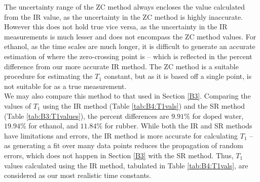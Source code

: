 The uncertainty range of the ZC method always encloses the value calculated from the IR value, as the uncertainty in the ZC method is highly inaccurate. However this does not hold true vice versa, as the uncertainty in the IR measurements is much lesser and does not encompass the ZC method values. For ethanol, as the time scales are much longer, it is difficult to generate an accurate estimation of where the zero-crossing point is -- which is reflected in the percent difference from our more accurate IR method. The ZC method is a suitable procedure for estimating the $T_1$ constant, but as it is based off a single point, is not suitable for as a true measurement.\\ 

We may also compare this method to that used in Section \ref{B3}. Comparing the values of $T_1$ using the IR method (Table \ref{tab:B4:T1vals}) and the SR method (Table \ref{tab:B3:T1values}), the percent differences are $9.91\%$ for doped water, $19.94\%$ for ethanol, and $11.84\%$ for rubber. While both the IR and SR methods have limitations and errors, the IR method is more accurate for calculating $T_1$ -- as generating a fit over many data points reduces the propagation of random errors, which does not happen in Section \ref{B3} with the SR method. Thus, $T_1$ values calculated using the IR method, tabulated in Table \ref{tab:B4:T1vals}, are considered as our most realistic time constants. \\